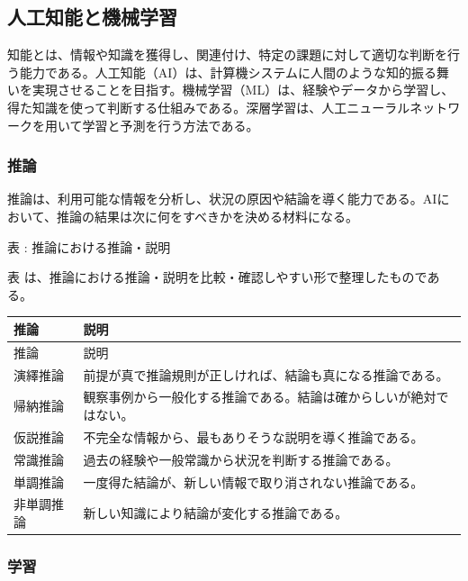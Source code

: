 \subsection{人工知能と機械学習}

知能とは、情報や知識を獲得し、関連付け、特定の課題に対して適切な判断を行う能力である。人工知能（AI）は、計算機システムに人間のような知的振る舞いを実現させることを目指す。機械学習（ML）は、経験やデータから学習し、得た知識を使って判断する仕組みである。深層学習は、人工ニューラルネットワークを用いて学習と予測を行う方法である。

\subsubsection{推論}

推論は、利用可能な情報を分析し、状況の原因や結論を導く能力である。AIにおいて、推論の結果は次に何をすべきかを決める材料になる。

\par\smallskip\noindent{}\label{tab:ch16-25}表 \thetable: 推論における推論・説明\par\smallskip
表 \thetable は、推論における推論・説明を比較・確認しやすい形で整理したものである。\par\smallskip
\begin{longtable}{>{\raggedright\arraybackslash}p{}>{\raggedright\arraybackslash}p{}}
\toprule
推論 & 説明 \\
\midrule
\endfirsthead
\toprule
推論 & 説明 \\
\midrule
\endhead
演繹推論 & 前提が真で推論規則が正しければ、結論も真になる推論である。 \\
帰納推論 & 観察事例から一般化する推論である。結論は確からしいが絶対ではない。 \\
仮説推論 & 不完全な情報から、最もありそうな説明を導く推論である。 \\
常識推論 & 過去の経験や一般常識から状況を判断する推論である。 \\
単調推論 & 一度得た結論が、新しい情報で取り消されない推論である。 \\
非単調推論 & 新しい知識により結論が変化する推論である。 \\
\bottomrule
\end{longtable}

\subsubsection{学習}

